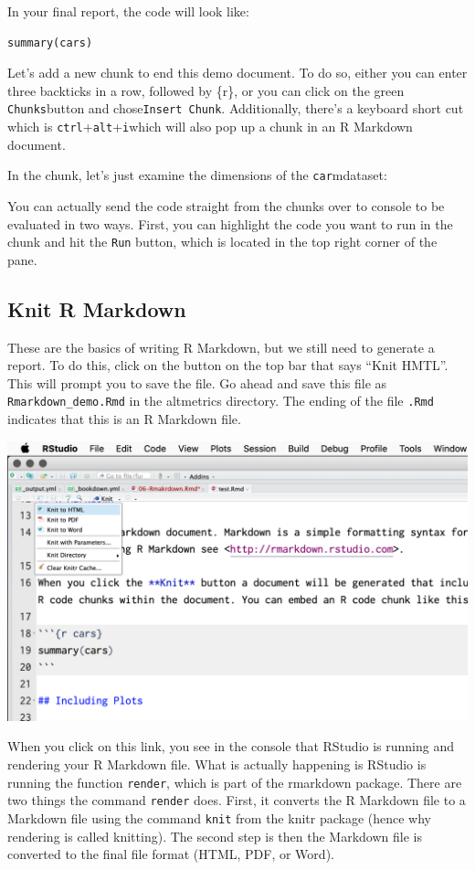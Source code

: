 \documentclass[
]{book}
\begin{document}
In your final report, the code will look like:

\begin{verbatim}
summary(cars)
\end{verbatim}

Let's add a new chunk to end this demo document. To do so, either you can enter three backticks in a row, followed by \{r\}, or you can click on the green \texttt{Chunks}button and chose\texttt{Insert\ Chunk}. Additionally, there's a keyboard short cut which is \texttt{ctrl}+\texttt{alt}+\texttt{i}which will also pop up a chunk in an R Markdown document.

In the chunk, let's just examine the dimensions of the \texttt{car}mdataset:

You can actually send the code straight from the chunks over to console to be evaluated in two ways. First, you can highlight the code you want to run in the chunk and hit the \texttt{Run} button, which is located in the top right corner of the pane.

\hypertarget{knit-r-markdown}{%
\subsection{Knit R Markdown}\label{knit-r-markdown}}

These are the basics of writing R Markdown, but we still need to generate a report. To do this, click on the button on the top bar that says ``Knit HMTL''. This will prompt you to save the file. Go ahead and save this file as \texttt{Rmarkdown\_demo.Rmd} in the altmetrics directory. The ending of the file \texttt{.Rmd} indicates that this is an R Markdown file.

\includegraphics{img/kh.png}

When you click on this link, you see in the console that RStudio is running and rendering your R Markdown file. What is actually happening is RStudio is running the function \texttt{render}, which is part of the rmarkdown package. There are two things the command \texttt{render} does. First, it converts the R Markdown file to a Markdown file using the command \texttt{knit} from the knitr package (hence why rendering is called knitting). The second step is then the Markdown file is converted to the final file format (HTML, PDF, or Word).
\end{document}
